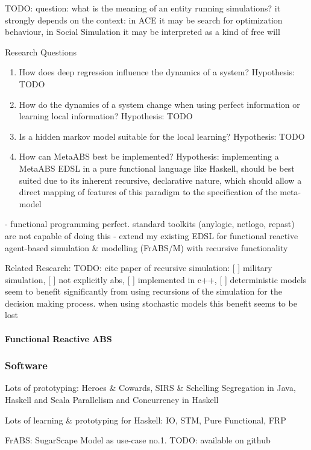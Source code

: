 TODO: question: what is the meaning of an entity running simulations? it strongly depends on the context: in ACE it may be search for optimization behaviour, in Social Simulation it may be interpreted as a kind of free will

Research Questions
\begin{enumerate}
	\item How does deep regression influence the dynamics of a system? Hypothesis: TODO
	\item How do the dynamics of a system change when using perfect information or learning local information? Hypothesis: TODO
	\item Is a hidden markov model suitable for the local learning? Hypothesis: TODO
	\item How can MetaABS best be implemented? Hypothesis: implementing a MetaABS EDSL in a pure functional language like Haskell, should be best suited due to its inherent recursive, declarative nature, which should allow a direct mapping of features of this paradigm to the specification of the meta-model
\end{enumerate}

- functional programming perfect. standard toolkits (anylogic, netlogo, repast) are not capable of doing this
- extend my existing EDSL for functional reactive agent-based simulation \& modelling (FrABS/M) with recursive functionality
 
Related Research:
TODO: \cite{gilmer_recursive_2000} cite paper of recursive simulation: [ ] military simulation, [ ] not explicitly abs, [ ] implemented in c++, [ ] deterministic models seem to benefit significantly from using recursions of the simulation for the decision making process. when using stochastic models this benefit seems to be lost


\paragraph{Functional Reactive ABS}

\subsubsection{Software}
Lots of prototyping:
Heroes \& Cowards, SIRS \& Schelling Segregation in Java, Haskell and Scala
Parallelism and Concurrency in Haskell

Lots of learning \& prototyping for Haskell:
IO, STM, Pure Functional, FRP

FrABS: SugarScape Model as use-case no.1. TODO: available on github

